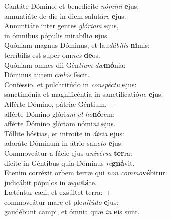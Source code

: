\evenverse Cantáte Dómino, et benedícite \textit{nó}\textit{mi}\textit{ni} \textbf{e}jus:~\*\\
\evenverse annuntiáte de die in diem salutá\textit{re} \textbf{e}jus.\\
\oddverse Annuntiáte inter gentes \textit{gló}\textit{ri}\textit{am} \textbf{e}jus,~\*\\
\oddverse in ómnibus pópulis mirabíli\textit{a} \textbf{e}jus.\\
\evenverse Quóniam magnus Dóminus, et lau\textit{dá}\textit{bi}\textit{lis} \textbf{ni}mis:~\*\\
\evenverse terríbilis est super om\textit{nes} \textbf{de}os.\\
\oddverse Quóniam omnes dii Gén\textit{ti}\textit{um} \textit{dæ}\textbf{mó}nia:~\*\\
\oddverse Dóminus autem cæ\textit{los} \textbf{fe}cit.\\
\evenverse Conféssio, et pulchritúdo in \textit{con}\textit{spé}\textit{ctu} \textbf{e}jus:~\*\\
\evenverse sanctimónia et magnificéntia in sanctificatió\textit{ne} \textbf{e}jus.\\
\oddverse Afférte Dómino, pátriæ Géntium,~+\\
\oddverse  afférte Dómino glóri\textit{am} \textit{et} \textit{ho}\textbf{nó}rem:~\*\\
\oddverse afférte Dómino glóriam nómi\textit{ni} \textbf{e}jus.\\
\evenverse Tóllite hóstias, et introíte in \textit{á}\textit{tri}\textit{a} \textbf{e}jus:~\*\\
\evenverse adoráte Dóminum in átrio san\textit{cto} \textbf{e}jus.\\
\oddverse Commoveátur a fácie ejus u\textit{ni}\textit{vér}\textit{sa} \textbf{ter}ra:~\*\\
\oddverse dícite in Géntibus quia Dóminus \textit{re}\textbf{gná}vit.\\
\evenverse Etenim corréxit orbem terræ qui \textit{non} \textit{com}\textit{mo}\textbf{vé}bitur:~\*\\
\evenverse judicábit pópulos in æ\textit{qui}\textbf{tá}te.\\
\oddverse Læténtur cæli, et exsúltet terra:~+\\
\oddverse  commoveátur mare et ple\textit{ni}\textit{tú}\textit{do} \textbf{e}jus:~\*\\
\oddverse gaudébunt campi, et ómnia quæ \textit{in} \textbf{e}is sunt.\\
